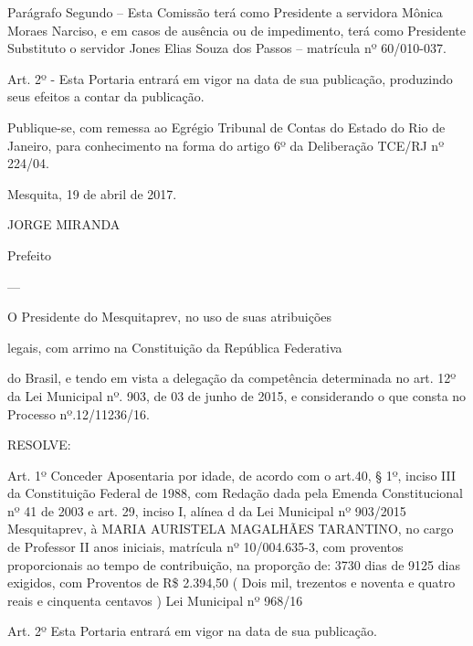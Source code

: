 \documentclass{doliberto}
\begin{document}
Parágrafo Segundo – Esta Comissão terá como Presidente a 
servidora  Mônica  Moraes  Narciso,  e  em  casos  de  ausência 
ou  de  impedimento,  terá  como  Presidente  Substituto  o 
servidor  Jones  Elias  Souza  dos  Passos  –  matrícula  nº 
60/010-037. 

 
Art.  2º  -  Esta  Portaria  entrará  em  vigor  na  data  de  sua 
publicação, produzindo seus efeitos a contar da publicação. 
 
Publique-se, com remessa ao Egrégio Tribunal de Contas do 
Estado  do  Rio  de  Janeiro,  para  conhecimento  na  forma  do 
artigo 6º da Deliberação TCE/RJ nº 224/04. 
 
Mesquita, 19 de abril de 2017. 
 
 

JORGE MIRANDA 

Prefeito 

---

O  Presidente  do  Mesquitaprev,  no  uso  de  suas  atribuições 
 
legais, com arrimo na Constituição da República Federativa 
 
do  Brasil,  e  tendo  em  vista  a  delegação  da  competência 
determinada no art. 12º da Lei Municipal nº. 903, de 03 de 
junho  de  2015,  e  considerando  o  que  consta  no  Processo 
nº.12/11236/16. 
                                                                                                                                
RESOLVE: 
 
Art. 1º Conceder Aposentaria  por  idade, de acordo com o 
art.40, § 1º, inciso III da Constituição Federal de 1988, com 
Redação dada pela Emenda Constitucional nº 41 de 2003 e 
art.  29,  inciso  I,  alínea  d  da  Lei  Municipal  nº  903/2015 
Mesquitaprev,  à  MARIA  AURISTELA  MAGALHÃES 
TARANTINO,  no  cargo  de  Professor  II  anos  iniciais, 
matrícula nº 10/004.635-3, com proventos proporcionais ao 
tempo de contribuição,  na proporção de: 3730 dias de 9125 
dias  exigidos,  com  Proventos  de  R\$  2.394,50  (  Dois  mil, 
trezentos e noventa e quatro reais e cinquenta centavos ) Lei 
Municipal nº 968/16 
 
                                                                                                                                                                                                                                                                                                                                                                                                                                                                                                                                                                                                                                                                                                                                                                                                                                                                                                  
Art.  2º  Esta  Portaria  entrará  em  vigor  na  data  de  sua 
publicação.  
\end{document}
